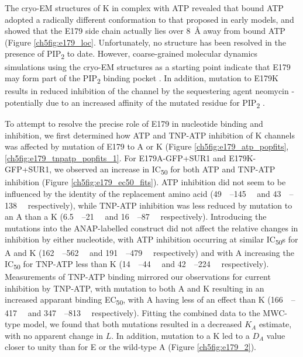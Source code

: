 The cryo-EM structures of K\ATP{} in complex with ATP revealed that bound ATP adopted a radically different conformation to that proposed in early models, and showed that the E179 side chain actually lies over \SI{8}{\angstrom} away from bound ATP \cite{lee_molecular_2017, martin_anti-diabetic_2017, li_structure_2017, puljung_cryo-electron_2018-1} (Figure \ref{ch5fig:e179_loc}.
Unfortunately, no structure has been resolved in the presence of PIP\textsubscript{2} to date.
However, coarse-grained molecular dynamics simulations using the cryo-EM structures as a starting point indicate that E179 may form part of the PIP\textsubscript{2} binding pocket \cite{pipatpolkai_evaluating_2020}.
In addition, mutation to E179K results in reduced inhibition of the channel by the sequestering agent neomycin - potentially due to an increased affinity of the mutated residue for PIP\textsubscript{2} \cite{pipatpolkai_evaluating_2020}.

To attempt to resolve the precise role of E179 in nucleotide binding and inhibition, we first determined how ATP and TNP-ATP inhibition of K\ATP{} channels was affected by mutation of E179 to A or K (Figure \ref{ch5fig:e179_atp_popfits}, \ref{ch5fig:e179_tnpatp_popfits_1}.
For E179A-GFP+SUR1 and E179K-GFP+SUR1, we observed an increase in IC\textsubscript{50} for both ATP and TNP-ATP inhibition (Figure \ref{ch5fig:e179_ec50_fits}).
ATP inhibition did not seem to be influenced by the identity of the replacement amino acid (\SIrange{49}{145}{\micro\Molar} and \SIrange{43}{138}{\micro\Molar} respectively), while TNP-ATP inhibition was less reduced by mutation to an A than a K (\SIrange{6.5}{21}{\micro\Molar} and \SIrange{16}{87}{\micro\Molar} respectively).
Introducing the mutations into the ANAP-labelled construct did not affect the relative changes in inhibition by either nucleotide, with ATP inhibition occurring at similar IC\textsubscript{50}s for A and K (\SIrange{162}{562}{\micro\Molar} and \SIrange{191}{479}{\micro\Molar} respectively) and with A increasing the IC\textsubscript{50} for TNP-ATP less than K (\SIrange{14}{44}{\micro\Molar} and \SIrange{42}{224}{\micro\Molar} respectively).
Measurements of TNP-ATP binding mirrored our observations for current inhibition by TNP-ATP, with mutation to both A and K resulting in an increased apparant binding EC\textsubscript{50}, with A having less of an effect than K (\SIrange{166}{417}{\micro\Molar} and \SIrange{347}{813}{\micro\Molar} respectively).
Fitting the combined data to the MWC-type model, we found that both mutations resulted in a decreased $K_A$ estimate, with no apparent change in $L$.
In addition, mutation to a K led to a $D_A$ value closer to unity than for E or the wild-type A (Figure \ref{ch5fig:e179_2}).

